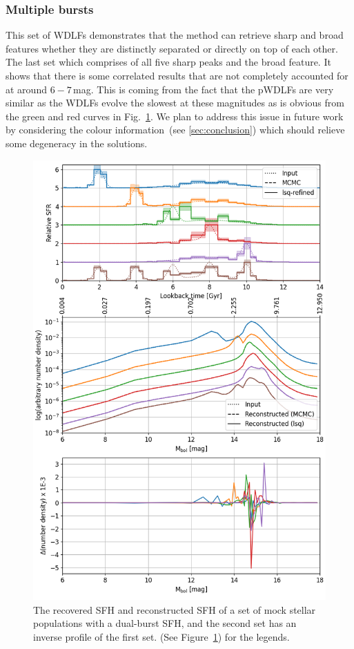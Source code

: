 \documentclass[fleqn,usenatbib]{mnras}
\begin{document}
\subsubsection*{Multiple bursts}
This set of WDLFs demonstrates that the method can retrieve sharp and
broad features whether they are distinctly separated or directly on top of each
other. The last set which comprises of all five sharp peaks and the broad
feature. It shows that there is some correlated results that are not completely
accounted for at around $6-7$\,mag. This is coming from the fact that the
pWDLFs are very similar as the WDLFs evolve the slowest at these magnitudes as
is obvious from the green and red curves in Fig.~\ref{fig:bursts_sfh}. We plan
to address this issue in future work by considering the colour
information~(see \ref{sec:conclusion}) which should relieve some degeneracy in
the solutions.

\begin{figure}
  \includegraphics[width=\columnwidth]{figures/fig_02_two_bursts_wdlf.png} 
  \caption{The recovered SFH and reconstructed SFH of a set of mock stellar
  populations with a dual-burst SFH, and the second set has an inverse profile
  of the first set. (See Figure~\ref{fig:bursts_sfh}) for the legends.}
  \label{fig:bursts_sfh}
\end{figure}
\end{document}
